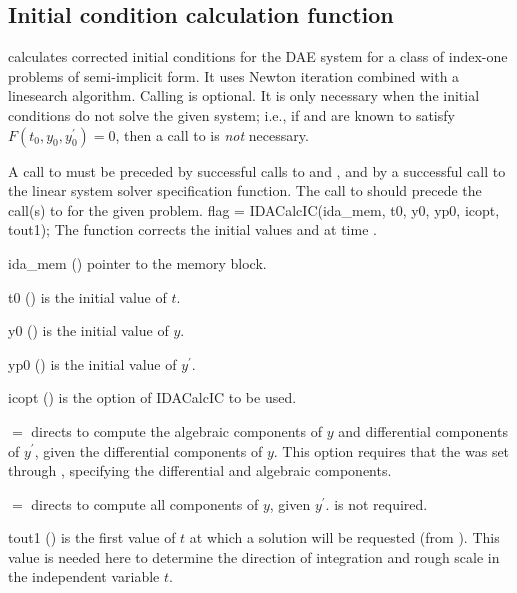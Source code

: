 \subsection{Initial condition calculation function}\label{ss:idacalcic}

 calculates corrected initial conditions for the DAE 
system for a class of index-one problems of semi-implicit form.
It uses Newton iteration combined with a linesearch algorithm.
Calling  is optional. It is only necessary when the  
initial conditions do not solve the given system;  i.e., if   
 and  are known to satisfy $F(t_0, y_0, y^\prime_0) = 0$, 
then a call to  is {\em not} necessary.

A call to  must be preceded by successful calls to  
 and , and by a successful call to the 
linear system solver specification function.  
The call to  should precede the call(s) to   
for the given problem.
%
{
  flag = IDACalcIC(ida\_mem, t0, y0, yp0, icopt, tout1);
}
{
  The function  corrects the initial values  and  at time .
}
{
  \begin{args}

  \item[ida\_mem] ()
    pointer to the {\ida} memory block.

  \item[t0] ()
    is the initial value of $t$.

  \item[y0] ()
    is the initial value of $y$. 

  \item[yp0] ()
    is the initial value of $y^\prime$.   

  \item[icopt] ()
    is the option of IDACalcIC to be used.
    
    $=$ directs  to compute 
    the algebraic components of $y$ and differential components of $y^\prime$, 
    given the differential components of $y$.  
    This option requires that the   was set through 
    , specifying the differential and algebraic components.  
    
    $=$ directs  to compute all  
    components of $y$, given $y^\prime$.   is not required.

  \item[tout1] ()
    is the first value of $t$ at which a solution will be requested (from ).
    This value 
    is needed here to determine the direction of integration and rough scale  
    in the independent variable $t$.   

  \end{args}
}
